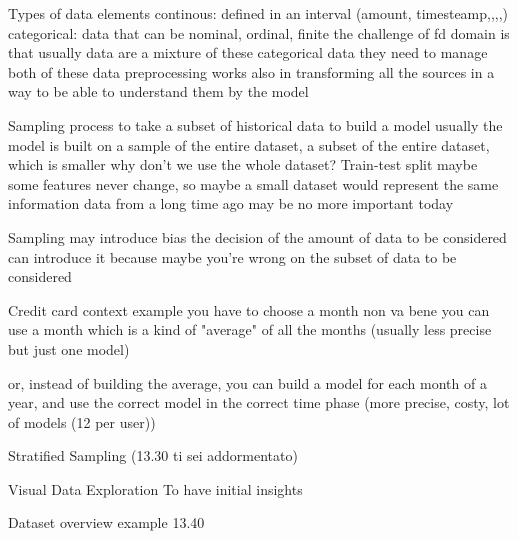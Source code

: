             Types of data elements
                continous: defined in an interval (amount, timesteamp,,,,)
                categorical: data that can be nominal, ordinal, finite 
                    the challenge of fd domain is that usually data are a mixture of these categorical data 
                    they need to manage both of these data 
                    preprocessing works also in transforming all the sources in a way to be able to understand them by the model 

            Sampling 
                process to take a subset of historical data to build a model 
                usually the model is built on a sample of the entire dataset, a subset of the entire dataset, which is smaller
                why don't we use the whole dataset?
                    Train-test split 
                    maybe some features never change, so maybe a small dataset would represent the same information
                    data from a long time ago may be no more important today

                Sampling may introduce bias 
                    the decision of the amount of data to be considered can introduce it because maybe you're wrong on the subset of data to be considered 

                    Credit card context example
                        you have to choose a month 
                            non va bene
                            you can use a month which is a kind of "average" of all the months (usually less precise but just one model)

                            or, instead of building the average, you can build a model for each month of a year, and use the correct model in the correct time phase (more precise, costy, lot of models (12 per user))

                Stratified Sampling (13.30 ti sei addormentato)

                Visual Data Exploration 
                    To have initial insights
                    
                Dataset overview example 13.40
\fi
